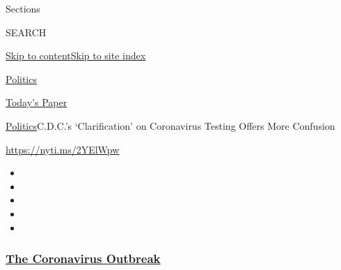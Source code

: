 Sections

SEARCH

\protect\hyperlink{site-content}{Skip to
content}\protect\hyperlink{site-index}{Skip to site index}

\href{https://www.nytimes3xbfgragh.onion/section/politics}{Politics}

\href{https://myaccount.nytimes3xbfgragh.onion/auth/login?response_type=cookie\&client_id=vi}{}

\href{https://www.nytimes3xbfgragh.onion/section/todayspaper}{Today's
Paper}

\href{/section/politics}{Politics}\textbar{}C.D.C.'s `Clarification' on
Coronavirus Testing Offers More Confusion

\url{https://nyti.ms/2YElWpw}

\begin{itemize}
\item
\item
\item
\item
\item
\end{itemize}

\hypertarget{the-coronavirus-outbreak}{%
\subsubsection{\texorpdfstring{\href{https://www.nytimes3xbfgragh.onion/news-event/coronavirus?name=styln-coronavirus-national\&region=TOP_BANNER\&block=storyline_menu_recirc\&action=click\&pgtype=Article\&impression_id=b6433390-f4ca-11ea-aafb-7b2c4efa9239\&variant=undefined}{The
Coronavirus
Outbreak}}{The Coronavirus Outbreak}}\label{the-coronavirus-outbreak}}

